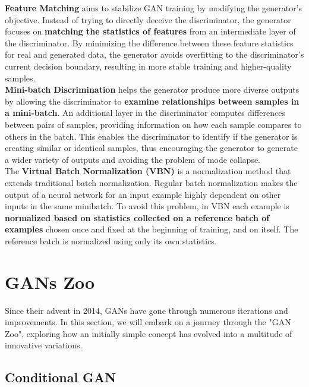 \begin{outline}
\textbf{Feature Matching} aims to stabilize GAN training by modifying the generator's objective. Instead of trying to directly deceive the discriminator, the generator focuses on \textbf{matching the statistics of features} from an intermediate layer of the discriminator. By minimizing the difference between these feature statistics for real and generated data, the generator avoids overfitting to the discriminator's current decision boundary, resulting in more stable training and higher-quality samples.
\\

\textbf{Mini-batch Discrimination} helps the generator produce more diverse outputs by allowing the discriminator to \textbf{examine relationships between samples in a mini-batch}. An additional layer in the discriminator computes differences between pairs of samples, providing information on how each sample compares to others in the batch. This enables the discriminator to identify if the generator is creating similar or identical samples, thus encouraging the generator to generate a wider variety of outputs and avoiding the problem of mode collapse.
\\

The \textbf{Virtual Batch Normalization (VBN)} is a normalization method that extends traditional batch normalization. Regular batch normalization makes the output of a neural network for an input example highly dependent on other inputs in the same minibatch. To avoid this problem, in VBN each example is \textbf{normalized based on statistics collected on a reference batch of examples} chosen once and fixed at the beginning of training, and on itself. The reference batch is normalized using only its own statistics. 
\end{outline}


\section{GANs Zoo}
Since their advent in 2014, GANs have gone through numerous iterations and improvements. In this section, we will embark on a journey through the "GAN Zoo", exploring how an initially simple concept has evolved into a multitude of innovative variations. 

\subsection{Conditional GAN}

